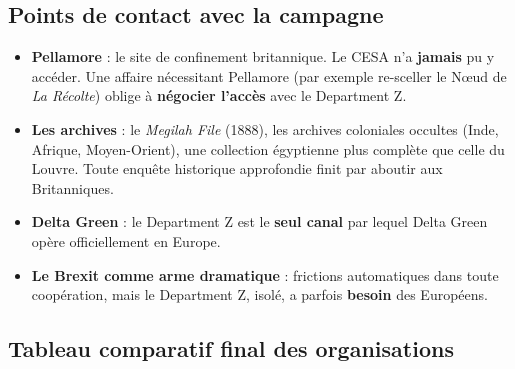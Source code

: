\documentclass[10pt,a5paper,twoside]{book}
\begin{document}
\subsection{Points de contact avec la campagne}

\begin{itemize}
	\item \textbf{Pellamore} : le site de confinement britannique. Le CESA n'a \textbf{jamais} pu y accéder. Une affaire nécessitant Pellamore (par exemple re-sceller le Nœud de \textit{La Récolte}) oblige à \textbf{négocier l'accès} avec le Department Z.
	\item \textbf{Les archives} : le \textit{Megilah File} (1888), les archives coloniales occultes (Inde, Afrique, Moyen-Orient), une collection égyptienne plus complète que celle du Louvre. Toute enquête historique approfondie finit par aboutir aux Britanniques.
	\item \textbf{Delta Green} : le Department Z est le \textbf{seul canal} par lequel Delta Green opère officiellement en Europe.
	\item \textbf{Le Brexit comme arme dramatique} : frictions automatiques dans toute coopération, mais le Department Z, isolé, a parfois \textbf{besoin} des Européens.
\end{itemize}

\clearpage

\subsection{Tableau comparatif final des organisations}
\end{document}
